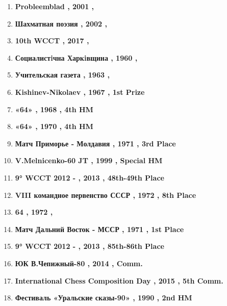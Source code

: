 \begin{enumerate}
\item  \textbf{ Probleemblad , 2001 , }
\item  \textbf{ Шахматная поэзия , 2002 , }
\item  \textbf{ 10th WCCT , 2017 , }
\item  \textbf{ Социалистiчна Харкiвщина , 1960 , }
\item  \textbf{ Учительская газета , 1963 , }
\item  \textbf{ Kishinev-Nikolaev , 1967 , 1st Prize }
\item  \textbf{ «64» , 1968 , 4th HM }
\item  \textbf{ «64» , 1970 , 4th HM }
\item  \textbf{ Матч Приморье  - Молдавия , 1971 , 3rd Place }
\item  \textbf{ V.Melnicenko-60 JT , 1999 , Special HM }
\item  \textbf{ 9° WCCT 2012 - , 2013 , 48th-49th Place }
\item  \textbf{ VIII командное первенство СССР , 1972 , 8th Place }
\item  \textbf{ 64 , 1972 , }
\item  \textbf{ Матч Дальний Восток - МССР , 1971 , 1st Place }
\item  \textbf{ 9° WCCT 2012 - , 2013 , 85th-86th Place }
\item  \textbf{ ЮК В.Чепижный-80 , 2014 , Comm. }
\item  \textbf{ International Chess Composition Day , 2015 , 5th Comm. }
\item  \textbf{ Фестиваль «Уральские сказы-90» , 1990 , 2nd HM }

\end{enumerate}